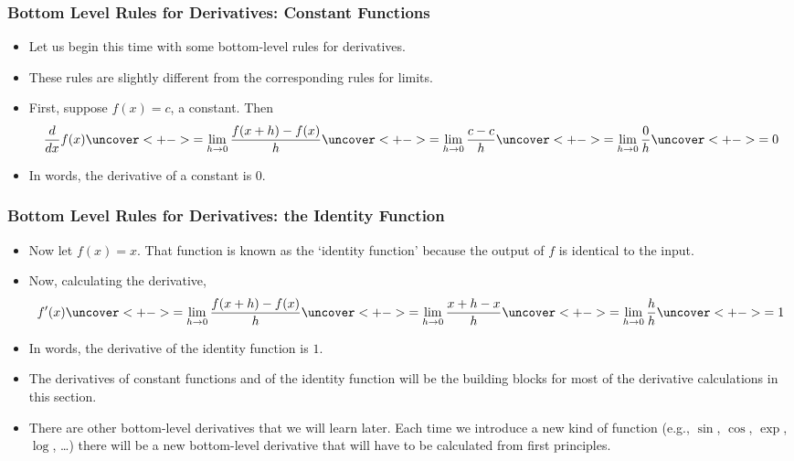 \documentclass[serif,ignorenonframetext]{beamer}
\begin{document}
\begin{frame}
  \frametitle{Bottom Level Rules for Derivatives: Constant Functions}
  \begin{itemize}[<+->]
  \item Let us begin this time with some bottom-level rules for derivatives.
  \item These rules are slightly different from the corresponding rules for
    limits.
  \item First, suppose $f(x)=c$, a constant.  Then
    \begin{align*}
      \frac{d}{dx} f(x) 
      \uncover<+->{= \lim_{h\to 0} \frac{f(x+h) - f(x)}{h}  }
      \uncover<+->{= \lim_{h\to 0} \frac{c - c}{h} }
      \uncover<+->{= \lim_{h\to 0} \frac{0}{h} }
      \uncover<+->{= 0}
    \end{align*}
  \item In words, the derivative of a constant is $0$.
  \end{itemize}
\end{frame}

\begin{frame}
  \frametitle{Bottom Level Rules for Derivatives: the Identity Function}
  \begin{itemize}[<+->]
  \item Now let $f(x)=x$.  That function is known as the `identity
    function' because the output of $f$ is identical to the input.
  \item Now, calculating the derivative,
    \begin{align*}
      f'(x) 
      \uncover<+->{= \lim_{h\to 0} \frac{f(x+h) - f(x)}{h}  }
      \uncover<+->{= \lim_{h\to 0} \frac{x+h - x}{h} }
      \uncover<+->{= \lim_{h\to 0} \frac{h}{h} }
      \uncover<+->{= 1}
    \end{align*}
  \item In words, the derivative of the identity function is $1$.
  \item The derivatives of constant functions and of the identity
    function will be the building blocks for most of the derivative
    calculations in this section.
  \item There are other bottom-level derivatives that we will learn later.
    Each time we introduce a new kind of function (e.g., 
    $\sin$, $\cos$, $\exp$, $\log$, \ldots) there
    will be a new bottom-level derivative that will have to be calculated
    from first principles.  
  \end{itemize}
\end{frame}
\end{document}
